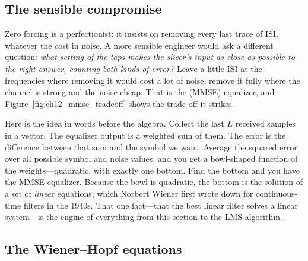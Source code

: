 \subsection{The sensible compromise}

Zero forcing is a perfectionist: it insists on removing every last trace of ISI, whatever the
cost in noise. A more sensible engineer would ask a different question: \emph{what setting of the
taps makes the slicer's input as close as possible to the right answer, counting both kinds of
error?} Leave a little ISI at the frequencies where removing it would cost a lot of noise; remove
it fully where the channel is strong and the noise cheap. That is the  (MMSE) equalizer, and Figure~\ref{fig:ch12_mmse_tradeoff} shows the trade-off it strikes.

Here is the idea in words before the algebra. Collect the last $L$ received samples in a vector.
The equalizer output is a weighted sum of them. The error is the difference between that sum and
the symbol we want. Average the squared error over all possible symbol and noise values, and you
get a bowl-shaped function of the weights---quadratic, with exactly one bottom. Find the bottom
and you have the MMSE equalizer. Because the bowl is quadratic, the bottom is the solution of a
set of \emph{linear} equations, which Norbert Wiener first wrote down for continuous-time
filters in the 1940s. That one fact---that the best linear filter solves a linear system---is
the engine of everything from this section to the LMS algorithm.

\subsection{The Wiener--Hopf equations}


